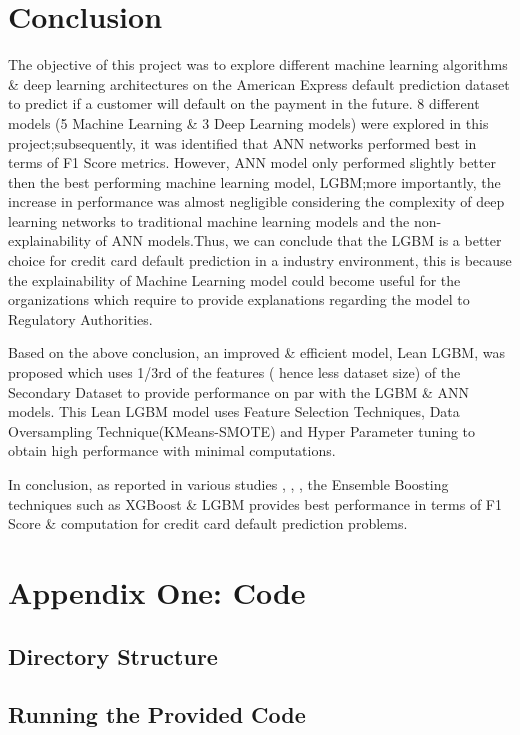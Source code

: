 \documentclass[twoside,11pt,a4paper]{article}
\begin{document}
\section{Conclusion}\label{sec:conclusion}
The objective of this project was to explore different machine learning algorithms \& deep learning architectures on the American Express default prediction dataset\citep{amex-default-prediction-dataset} to predict if a customer will default on the payment in the future. 8 different models (5 Machine Learning \& 3 Deep Learning models) were explored in this project;subsequently, it was identified that \acf{ANN} networks performed best in terms of F1 Score metrics. However, \acs{ANN} model only performed slightly better then the best performing machine learning model, \acs{LGBM};more importantly, the increase in performance was almost negligible considering the complexity of deep learning networks to traditional machine learning models and the non-explainability of \acs{ANN} models.Thus, we can conclude that the \acs{LGBM} is a better choice for credit card default prediction in a industry environment, this is because the explainability of Machine Learning model could become useful for the organizations which require to provide explanations regarding the model to Regulatory Authorities.

Based on the above conclusion, an improved \& efficient model, Lean \acs{LGBM}, was proposed which uses 1/3rd of the features ( hence less dataset size) of the Secondary Dataset to provide performance on par with the \acs{LGBM} \& \acs{ANN} models. This Lean \acs{LGBM} model uses Feature Selection Techniques, Data Oversampling Technique(KMeans-\acs{SMOTE}) and Hyper Parameter tuning to obtain high performance with minimal computations. 

In conclusion,   as reported in various studies \citep{alam2020investigation}, \citep{faraj2021comparison}, \citep{emil2019enhancing}, the Ensemble Boosting techniques such as \acs{XGBoost} \& \acs{LGBM} provides best performance in terms of F1 Score \& computation for credit card default prediction problems. 



\vfill
\clearpage
\lhead{}\rhead{}
{}
 


\vfill
\clearpage
\section{Appendix One: Code}

\subsection{Directory Structure} 

\subsection{Running the Provided Code}

\clearpage
\end{document}

